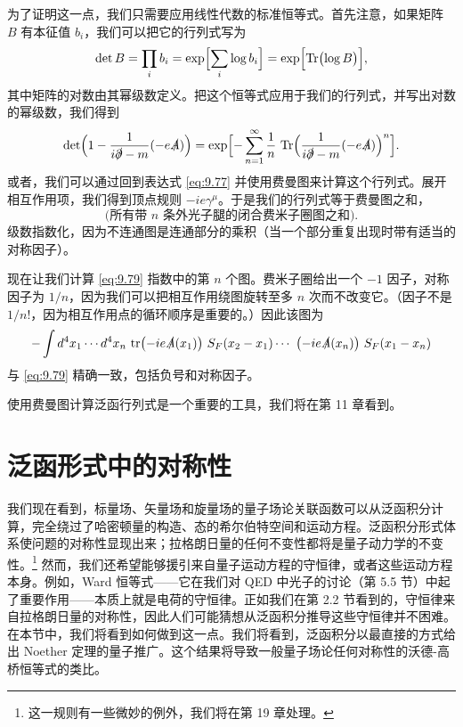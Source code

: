 为了证明这一点，我们只需要应用线性代数的标准恒等式。首先注意，如果矩阵 $B$ 有本征值 $b_i$，我们可以把它的行列式写为
\begin{equation}
  \det B = \prod_i b_i = \exp\Bigl[ \sum_i \log b_i \Bigr]
  = \exp\Bigl[ \mathrm{Tr}\bigl( \log B \bigr) \Bigr],
  \label{eq:9.78}
\end{equation}
其中矩阵的对数由其幂级数定义。把这个恒等式应用于我们的行列式，并写出对数的幂级数，我们得到
\begin{equation}
  \det\Bigl( 1 - \frac{1}{i\slashed{\partial}-m}(-e\slashed{A}) \Bigr)
  = \exp\Bigl[ -\sum_{n=1}^{\infty} \frac{1}{n}\ \mathrm{Tr}\Bigl(
    \frac{1}{i\slashed{\partial}-m}(-e\slashed{A}) \Bigr)^n \Bigr] .
  \label{eq:9.79}
\end{equation}
或者，我们可以通过回到表达式 \eqref{eq:9.77} 并使用费曼图来计算这个行列式。展开相互作用项，我们得到顶点规则 $-ie\gamma^\mu$。于是我们的行列式等于费曼图之和，
\begin{equation}
  \text{(所有带 } n \text{ 条外光子腿的闭合费米子圈图之和)} .
  \label{eq:9.80}
\end{equation}
级数指数化，因为不连通图是连通部分的乘积（当一个部分重复出现时带有适当的对称因子）。

现在让我们计算 \eqref{eq:9.79} 指数中的第 $n$ 个图。费米子圈给出一个 $-1$ 因子，对称因子为 $1/n$，因为我们可以把相互作用绕图旋转至多 $n$ 次而不改变它。（因子不是 $1/n!$，因为相互作用点的循环顺序是重要的。）因此该图为
\begin{equation}
  -\int d^4x_1\cdots d^4x_n\ \mathrm{tr}\bigl( -ie\slashed{A}(x_1) \bigr)\
    S_F(x_2-x_1)\cdots\ \bigl( -ie\slashed{A}(x_n) \bigr)\ S_F(x_1-x_n)
  \label{eq:9.81}
\end{equation}
与 \eqref{eq:9.79} 精确一致，包括负号和对称因子。

使用费曼图计算泛函行列式是一个重要的工具，我们将在第 11 章看到。

\section{泛函形式中的对称性}

我们现在看到，标量场、矢量场和旋量场的量子场论关联函数可以从泛函积分计算，完全绕过了哈密顿量的构造、态的希尔伯特空间和运动方程。泛函积分形式体系使问题的对称性显现出来；拉格朗日量的任何不变性都将是量子动力学的不变性。\footnote{这一规则有一些微妙的例外，我们将在第 19 章处理。} 然而，我们还希望能够援引来自量子运动方程的守恒律，或者这些运动方程本身。例如，Ward 恒等式——它在我们对 QED 中光子的讨论（第 5.5 节）中起了重要作用——本质上就是电荷的守恒律。正如我们在第 2.2 节看到的，守恒律来自拉格朗日量的对称性，因此人们可能猜想从泛函积分推导这些守恒律并不困难。在本节中，我们将看到如何做到这一点。我们将看到，泛函积分以最直接的方式给出 Noether 定理的量子推广。这个结果将导致一般量子场论任何对称性的沃德-高桥恒等式的类比。

